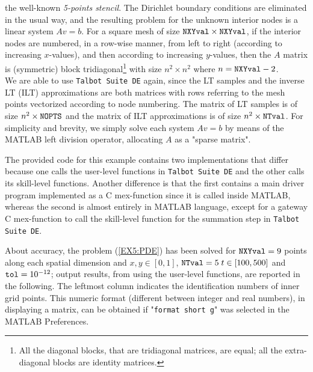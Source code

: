 \documentclass[a4paper,10pt]{report}%
\begin{document}
the well-known {\em 5-points stencil}. The Dirichlet boundary conditions are eliminated in the usual way, and
the resulting problem for the unknown interior nodes is a linear system $Av=b$.
For a square mesh of size ${\tt NXYval}\times{\tt NXYval}$, if the interior nodes are numbered, in a row-wise manner, from left to right (according to increasing $x$-values), and then according to increasing $y$-values, then the $A$ matrix is (symmetric) block tridiagonal\footnote{ All the diagonal blocks, that are tridiagonal
matrices, are equal; all the extra-diagonal blocks are identity matrices.} with size $n^2\times n^2$ where
$n={\tt NXYval}-2$.
\\
We are able to use {\tt Talbot Suite DE} again, since the LT samples and the inverse LT (ILT)
approximations are both matrices with rows referring to the mesh points vectorized according to node
numbering. The matrix of LT samples is of size $n^2\times{\tt NOPTS}$ and the matrix of ILT
approximations is of size $n^2\times{\tt NTval}$. For simplicity and brevity, we simply solve each
system $Av=b$ by means of the MATLAB left division operator, allocating $A$ as a "sparse matrix".

The provided code for this example contains two implementations that differ because one calls the
user-level functions in {\tt Talbot Suite DE} and the other calls its skill-level functions.
Another difference is that the first contains a main driver program implemented as a C mex-function
since it is called inside MATLAB, whereas the second is almost entirely in MATLAB language, except
for a gateway C mex-function to call the skill-level function for the summation step in
{\tt Talbot Suite DE}.

About accuracy, the problem (\ref{EX5:PDE}) has been solved for ${\tt NXYval}=9$ points along each
spatial dimension and $x,y\in[0,1]$, ${\tt NTval}=5\; t\in[100,500]$ and ${\tt tol}=10^{-12}$; output
results, from using the user-level functions, are reported in the following.
The leftmost column indicates the identification numbers of inner grid points.
This numeric format (different between integer and real numbers), in displaying a matrix, can be obtained if
"{\tt format short g}" was selected in the MATLAB Preferences.
\end{document}
